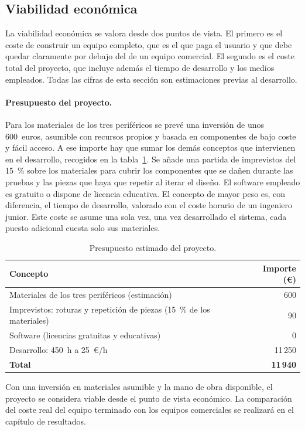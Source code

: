 \subsection{Viabilidad económica}
\label{sec:viabilidad-economica}

La viabilidad económica se valora desde dos puntos de vista. El primero es el coste de construir un equipo completo, que es el que paga el usuario y que debe quedar claramente por debajo del de un equipo comercial. El segundo es el coste total del proyecto, que incluye además el tiempo de desarrollo y los medios empleados. Todas las cifras de esta sección son estimaciones previas al desarrollo.

\paragraph{Presupuesto del proyecto.}
Para los materiales de los tres periféricos se prevé una inversión de unos 600~euros, asumible con recursos propios y basada en componentes de bajo coste y fácil acceso. A ese importe hay que sumar los demás conceptos que intervienen en el desarrollo, recogidos en la tabla~\ref{tab:presupuesto}. Se añade una partida de imprevistos del 15~\% sobre los materiales para cubrir los componentes que se dañen durante las pruebas y las piezas que haya que repetir al iterar el diseño. El software empleado es gratuito o dispone de licencia educativa. El concepto de mayor peso es, con diferencia, el tiempo de desarrollo, valorado con el coste horario de un ingeniero junior. Este coste se asume una sola vez, una vez desarrollado el sistema, cada puesto adicional cuesta solo sus materiales.

\begin{table}[htbp]
	\centering
	\caption{Presupuesto estimado del proyecto.}
	\label{tab:presupuesto}
	\small
	\begin{tabular}{|p{}|r|}
		\hline
		\textbf{Concepto} & \textbf{Importe (€)} \\
		\hline
		Materiales de los tres periféricos (estimación) & 600 \\
		Imprevistos: roturas y repetición de piezas (15~\% de los materiales) & 90 \\
		Software (licencias gratuitas y educativas) & 0 \\
		Desarrollo: 450~h a 25~€/h & 11\,250 \\
		\hline
		\textbf{Total} & \textbf{11\,940} \\
		\hline
	\end{tabular}
\end{table}

Con una inversión en materiales asumible y la mano de obra disponible, el proyecto se considera viable desde el punto de vista económico. La comparación del coste real del equipo terminado con los equipos comerciales se realizará en el capítulo de resultados.
